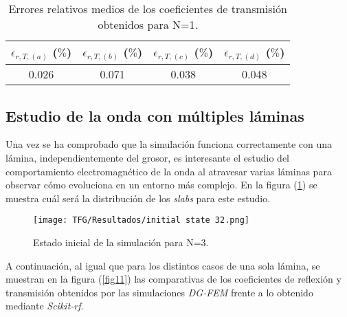 \documentclass[11pt,a4paper,twoside,pdf]{article}
\numberwithin{equation}{section}
\begin{document}
\begin{table}[H]
\centering
\begin{tabular}{|c|c|c|c|}
\hline
\textbf{$\epsilon_{r,T,(a)}$ ($\%$)} & \textbf{$\epsilon_{r,T,(b)}$ ($\%$)} & \textbf{$\epsilon_{r,T,(c)}$ ($\%$)} & \textbf{$\epsilon_{r,T,(d)}$ ($\%$)} \\ \hline
0.026                                & 0.071                                & 0.038                                & 0.048                                \\ \hline
\end{tabular}
\caption{Errores relativos medios de los coeficientes de transmisión obtenidos para N=1.}
\label{tab3}
\end{table}
\newpage
\subsection{Estudio de la onda con múltiples láminas}
Una vez se ha comprobado que la simulación funciona correctamente con una lámina, independientemente del grosor, es interesante el estudio del comportamiento electromagnético de la onda al atravesar varias láminas para observar cómo evoluciona en un entorno más complejo. En la figura (\ref{fig10}) se muestra cuál será la distribución de los \textit{slabs} para este estudio.

\begin{figure}[H]
\centering
\texttt{[image: TFG/Resultados/initial state 32.png]}	
\caption{Estado inicial de la simulación para N=3.}
\label{fig10}
\end{figure}

A continuación, al igual que para los distintos casos de una sola lámina, se muestran en la figura (\ref{fig11}) las comparativas de los coeficientes de reflexión y transmisión obtenidos por las simulaciones \textit{DG-FEM} frente a lo obtenido mediante \textit{Scikit-rf}.
\end{document}
